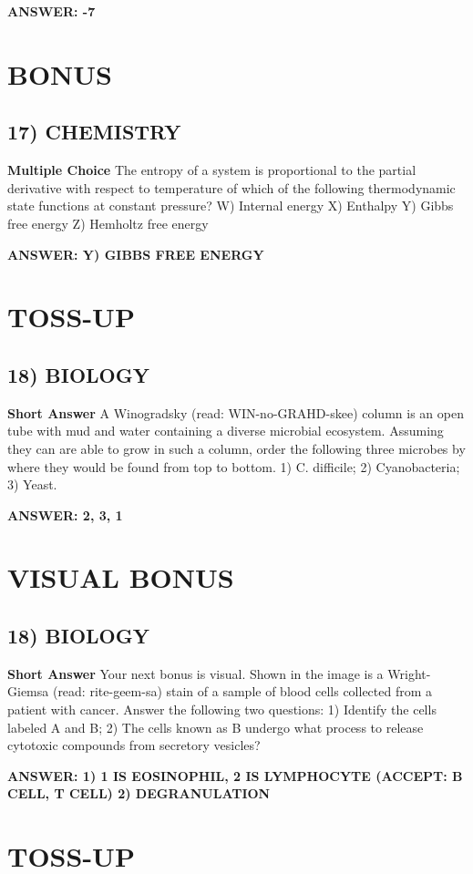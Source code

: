 \documentclass{article}
\begin{document}
\textbf{ANSWER: -7}

\section*{BONUS}
\subsection*{17) CHEMISTRY}
\textbf{Multiple Choice} The entropy of a system is proportional to the partial derivative with respect to temperature of which of the following thermodynamic state functions at constant pressure?
W) Internal energy
X) Enthalpy
Y) Gibbs free energy
Z) Hemholtz free energy

\textbf{ANSWER: Y) GIBBS FREE ENERGY}

\section*{TOSS-UP}
\subsection*{18) BIOLOGY}
\textbf{Short Answer} A Winogradsky (read: WIN-no-GRAHD-skee) column is an open tube with mud and water containing a diverse microbial ecosystem.
Assuming they can are able to grow in such a column, order the following three microbes by where they would be found from top to bottom.
1) C. difficile; 2) Cyanobacteria; 3) Yeast.

\textbf{ANSWER: 2, 3, 1}

\section*{VISUAL BONUS}
\subsection*{18) BIOLOGY}
\textbf{Short Answer} Your next bonus is visual. Shown in the image is a Wright-Giemsa (read: rite-geem-sa) stain of a sample of blood cells collected from a patient with cancer.
Answer the following two questions: 1) Identify the cells labeled A and B;
2) The cells known as B undergo what process to release cytotoxic compounds from secretory vesicles?

\textbf{ANSWER: 1) 1 IS EOSINOPHIL, 2 IS LYMPHOCYTE (ACCEPT: B CELL, T CELL) 2) DEGRANULATION}

\section*{TOSS-UP}
\end{document}
